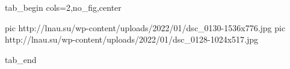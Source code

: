  
 
 
 
 


\ifcmt
  tab_begin cols=2,no_fig,center

     pic http://lnau.su/wp-content/uploads/2022/01/dsc_0130-1536x776.jpg
		 pic http://lnau.su/wp-content/uploads/2022/01/dsc_0128-1024x517.jpg

  tab_end
\fi
